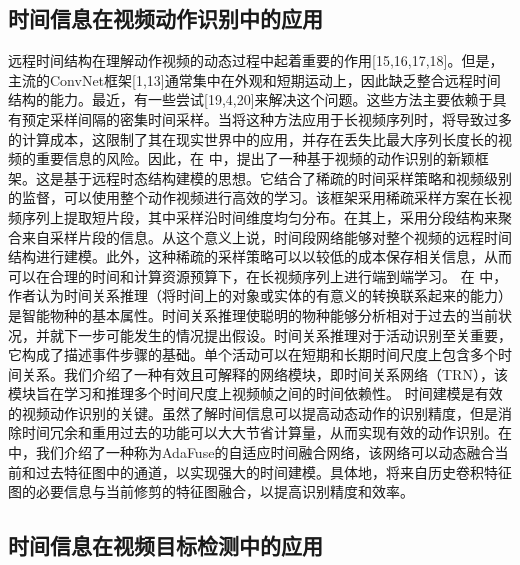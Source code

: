 \subsection{时间信息在视频动作识别中的应用}
远程时间结构在理解动作视频的动态过程中起着重要的作用[15,16,17,18]。但是，主流的ConvNet框架[1,13]通常集中在外观和短期运动上，因此缺乏整合远程时间结构的能力。最近，有一些尝试[19,4,20]来解决这个问题。这些方法主要依赖于具有预定采样间隔的密集时间采样。当将这种方法应用于长视频序列时，将导致过多的计算成本，这限制了其在现实世界中的应用，并存在丢失比最大序列长度长的视频的重要信息的风险。因此，在 \cite{TSN} 中，提出了一种基于视频的动作识别的新颖框架。这是基于远程时态结构建模的思想。它结合了稀疏的时间采样策略和视频级别的监督，可以使用整个动作视频进行高效的学习。该框架采用稀疏采样方案在长视频序列上提取短片段，其中采样沿时间维度均匀分布。在其上，采用分段结构来聚合来自采样片段的信息。从这个意义上说，时间段网络能够对整个视频的远程时间结构进行建模。此外，这种稀疏的采样策略可以以较低的成本保存相关信息，从而可以在合理的时间和计算资源预算下，在长视频序列上进行端到端学习。%
在 \cite{TRN} 中，作者认为时间关系推理（将时间上的对象或实体的有意义的转换联系起来的能力）是智能物种的基本属性。时间关系推理使聪明的物种能够分析相对于过去的当前状况，并就下一步可能发生的情况提出假设。时间关系推理对于活动识别至关重要，它构成了描述事件步骤的基础。单个活动可以在短期和长期时间尺度上包含多个时间关系。我们介绍了一种有效且可解释的网络模块，即时间关系网络（TRN），该模块旨在学习和推理多个时间尺度上视频帧之间的时间依赖性。%
时间建模是有效的视频动作识别的关键。虽然了解时间信息可以提高动态动作的识别精度，但是消除时间冗余和重用过去的功能可以大大节省计算量，从而实现有效的动作识别。在 \cite{AdaFuse} 中，我们介绍了一种称为AdaFuse的自适应时间融合网络，该网络可以动态融合当前和过去特征图中的通道，以实现强大的时间建模。具体地，将来自历史卷积特征图的必要信息与当前修剪的特征图融合，以提高识别精度和效率。%
\subsection{时间信息在视频目标检测中的应用}
